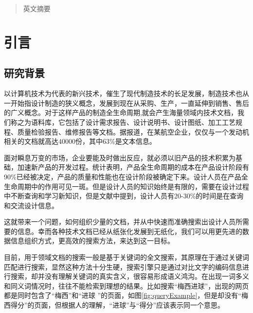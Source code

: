 \documentclass[12pt,a4paper]{article}
\begin{document}
\newpage
\renewcommand\abstractname{Abstract}
\begin{abstract}
英文摘要
\end{abstract}

\newpage



\setlength{\baselineskip}{20pt} %
\renewcommand{\contentsname}{目\quad 录}
\tableofcontents



\newpage
\makeatletter %
\section{引言} 
	\subsection{研究背景}
   以计算机技术为代表的新兴技术，催生了现代制造技术的长足发展，制造技术也从一开始指设计制造的狭义概念，发展到现在从采购、生产，一直延伸到销售、售后的广义概念。对于这样产品的制造全生命周期,就会产生海量领域内技术文档，我们称之为语料库，它包括了设计需求报告、设计说明书、设计图纸、加工工艺规程、质量检验报告、维修报告等文档。据报道，在某航空企业，仅仅与一个发动机相关的文档就高达40000份，其中63\%是文本信息。 \cite{1}
   
   面对瞬息万变的市场，企业要能及时做出反应，就必须以旧产品的技术积累为基础，加速新产品的开发过程。统计表明，产品全生命周期的成本在产品设计阶段有90\%已经被决定，产品的质量和性能也在设计阶段被确定下来。\cite{2}设计人员在产品全生命周期中的作用可见一斑。但是设计人员的知识始终是有限的，需要在设计过程中不断查询和学习新知识，但是文献\cite{1}中提到，设计人员有20-30\%的时间是在查询和交流设计信息。
   
   这就带来一个问题，如何组织少量的文档，并从中快速而准确搜索出设计人员所需要的信息。幸而各种技术文档已经从纸张化发展到无纸化，我们可以用更先进的数据信息组织方式，更高效的搜索方法，来达到这一目标。
   
   目前，用于领域文档的搜索一般是基于关键词的全文搜索，其原理在于通过关键词匹配进行搜索，显然这种方法十分生硬，搜索引擎只是通过对比文字的编码信息进行搜索，却并没有理解关键词的真实含义，很容易形成语义鸿沟。在出现一词多义和同义词情况时，往往不能检索到理想的结果。比如搜索“梅西进球”，出现的网页都是同时包含了“梅西”和“进球 ”的页面，如图{\ref{fig:queryExample}}，但是却没有“梅西得分”的页面，但根据人的理解，“进球”与“得分”应该表示同一个意思。
   
\end{document}
